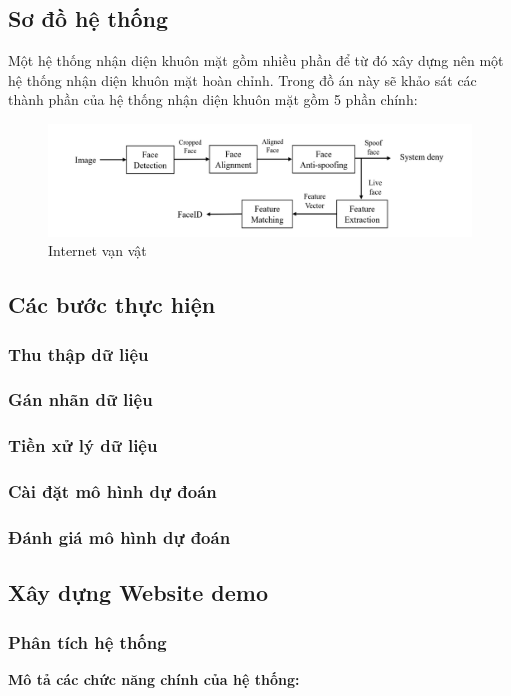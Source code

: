 \subsection*{Sơ đồ hệ thống}
Một hệ thống nhận diện khuôn mặt gồm nhiều phần để từ đó xây dựng nên một hệ thống nhận diện khuôn mặt hoàn chỉnh. Trong đồ án này sẽ khảo sát các thành phần của hệ thống nhận diện khuôn mặt gồm 5 phần chính:
\begin{figure}[h]
\centering
\includegraphics[width=1.1\linewidth]{Figures/LuongMohinh}
\caption{Internet vạn vật}
\label{fig:iot}
\end{figure}

\subsection*{Các bước thực hiện}
\subsubsection*{Thu thập dữ liệu}
\subsubsection*{Gán nhãn dữ liệu}
\subsubsection*{Tiền xử lý dữ liệu}
\subsubsection*{Cài đặt mô hình dự đoán}
\subsubsection*{Đánh giá mô hình dự đoán}
\subsection*{Xây dựng Website demo}
\subsubsection*{Phân tích hệ thống}
\textbf{Mô tả các chức năng chính của hệ thống:}

